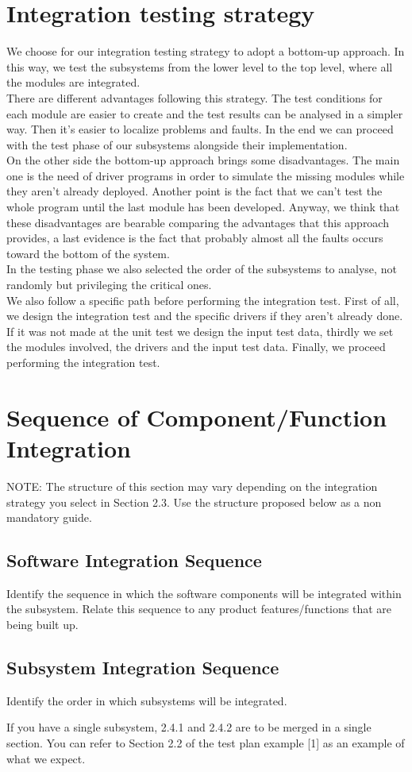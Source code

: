 \section{Integration testing strategy}
We choose for our integration testing strategy to adopt a bottom-up approach. In this way, we test the subsystems from the lower level to the top level, where all the modules are integrated. 
\\There are different advantages following this strategy. The test conditions for each module are easier to create and the test results can be analysed in a simpler way. Then it's easier to localize problems and faults. In the end we can proceed with the test phase of our subsystems alongside their implementation.
\\On the other side the bottom-up approach brings some disadvantages. The main one is the need of driver programs in order to simulate the missing modules while they aren't already deployed. Another point is the fact that we can't test the whole program until the last module has been developed. Anyway, we think that these disadvantages are bearable comparing the advantages that this approach provides, a last evidence is the fact that probably almost all the faults occurs toward the bottom of the system.
\\In the testing phase we also selected the order of the subsystems to analyse, not randomly but privileging the critical ones.
\\ We also follow a specific path before performing the integration test. First of all, we design the integration test and the specific drivers if they aren't already done. If it was not made at the unit test we design the input test data, thirdly we set the modules involved, the drivers and the input test data. Finally, we proceed performing the integration test.

\section{Sequence of Component/Function Integration}
NOTE: The structure of this section may vary depending on the integration strategy you select in Section 2.3. Use the structure proposed below as a non mandatory guide.

	\subsection{Software Integration Sequence}
	Identify the sequence in which the software components will be integrated within the subsystem. Relate this sequence to any product features/functions that are being built up.
	\subsection{Subsystem Integration Sequence}
	Identify the order in which subsystems will be integrated.

If you have a single subsystem, 2.4.1 and 2.4.2 are to be merged in a single section. You can refer to Section 2.2 of the test plan example [1] as an example of what we expect.
